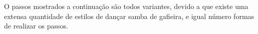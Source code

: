 

O passos mostrados a continuação são todos variantes, 
devido a que existe uma extensa quantidade de estilos de dançar samba de gafieira,
e igual número formas de realizar os passos. 

